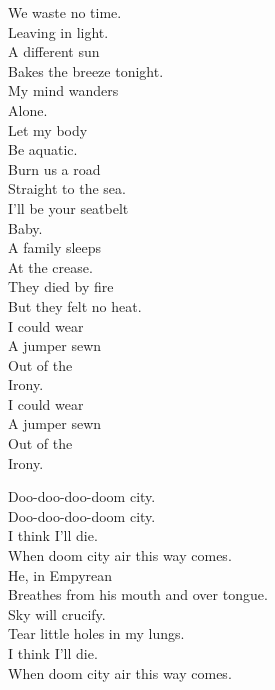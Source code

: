 We waste no time. \\
Leaving in light. \\
A different sun \\
Bakes the breeze tonight. \\

My mind wanders \\
Alone. \\
Let my body \\
Be aquatic. \\

Burn us a road \\
Straight to the sea. \\
I'll be your seatbelt \\
Baby. \\

A family sleeps \\
At the crease. \\
They died by fire \\
But they felt no heat. \\
I could wear \\
A jumper sewn \\
Out of the \\
Irony. \\

I could wear \\
A jumper sewn \\
Out of the \\
Irony. \\




Doo-doo-doo-doom city. \\
Doo-doo-doo-doom city. \\

I think I'll die. \\
When doom city air this way comes. \\
He, in Empyrean \\
Breathes from his mouth and over tongue. \\
Sky will crucify. \\
Tear little holes in my lungs. \\
I think I'll die. \\
When doom city air this way comes. \\

